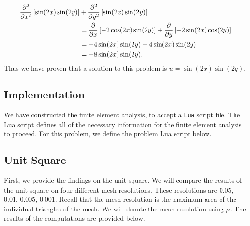\documentclass[../fem.tex]{subfile}
\begin{document}
\begin{align*}
  \frac{\partial^2 }{\partial {x}^2}\left[\sin(2x)\sin(2y)\right]&+\frac{\partial^2 }{\partial {y}^2}\left[\sin(2x)\sin(2y)\right]\\
                                          &=\frac{\partial }{\partial x}\left[-2\cos(2x)\sin(2y)\right]+\frac{\partial }{\partial y}\left[-2\sin(2x)\cos(2y)\right]\\
                                          &=-4\sin(2x)\sin(2y)-4\sin(2x)\sin(2y)\\
                                          &=-8\sin(2x)\sin(2y).
\end{align*}
Thus we have proven that a solution to this problem is $u=\sin(2x)\sin(2y)$.

\subsection{Implementation}%
\label{sub:implementation}

We have constructed the finite element analysis, to accept a \texttt{Lua}
script file. The Lua script defines all of the necessary information for the
finite element analysis to proceed. For this problem, we define the problem Lua
script below.


\subsection{Unit Square}%
\label{sub:unit_square}

First, we provide the findings on the unit square. We will compare the results
of the unit square on four different mesh resolutions. These resolutions are
$0.05$, $0.01$, $0.005$, $0.001$. Recall that the mesh resolution is the maximum
area of the individual triangles of the mesh. We will denote the mesh
resolution using $\mu$. The results of the computations are provided below.
\end{document}
